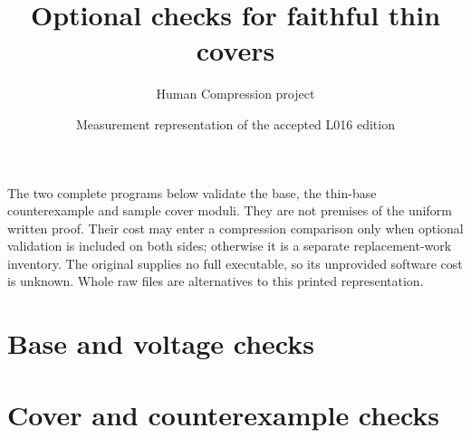 \documentclass[a4paper,10pt]{article}
\title{Optional checks for faithful thin covers}\author{Human Compression project}
\date{Measurement representation of the accepted L016 edition}
\begin{document}
\maketitle
The two complete programs below validate the base, the thin-base counterexample
and sample cover moduli. They are not premises of the uniform written proof.
Their cost may enter a compression comparison only when optional validation is
included on both sides; otherwise it is a separate replacement-work inventory.
The original supplies no full executable, so its unprovided software cost is
unknown. Whole raw files are alternatives to this printed representation.
\section*{Base and voltage checks}
\section*{Cover and counterexample checks}
\end{document}
